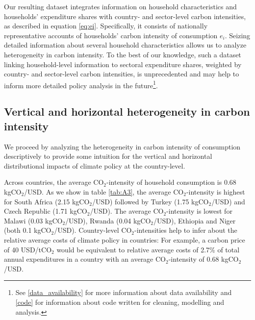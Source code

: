 \documentclass[12pt, a4paper]{article}
\begin{document}
Our resulting dataset integrates information on household characteristics and households' expenditure shares with country- and sector-level carbon intensities, as described in equation \ref{eq:ei}. Specifically, it consists of nationally representative accounts of households' carbon intensity of consumption $e_{i}$. Seizing detailed information about several household characteristics allows us to analyze heterogeneity in carbon intensity. To the best of our knowledge, such a dataset linking household-level information to sectoral expenditure shares, weighted by country- and sector-level carbon intensities, is unprecedented and may help to inform more detailed policy analysis in the future\footnote{See \ref{data_availability} for more information about data availability and \ref{code} for information about code written for cleaning, modelling and analysis.}.

\subsection{Vertical and horizontal heterogeneity in carbon intensity} \label{sec:descriptive}

We proceed by analyzing the heterogeneity in carbon intensity of consumption descriptively to provide some intuition for the vertical and horizontal distributional impacts of climate policy at the country-level.

Across countries, the average CO$_{2}$-intensity of household consumption is 0.68 kgCO$_{2}$/USD. As we show in table \ref{tab:A3}, the average CO$_{2}$-intensity is highest for South Africa (2.15 kgCO$_{2}$/USD) followed by Turkey (1.75 kgCO$_{2}$/USD) and Czech Republic (1.71 kgCO$_{2}$/USD). The average CO$_{2}$-intensity is lowest for Malawi (0.03 kgCO$_{2}$/USD), Rwanda (0.04 kgCO$_{2}$/USD), Ethiopia and Niger (both 0.1 kgCO$_{2}$/USD). Country-level CO$_{2}$-intensities help to infer about the relative average costs of climate policy in countries: For example, a carbon price of 40 USD/tCO$_{2}$ \autocite{Stiglitz.2017} would be equivalent to relative average costs of 2.7\% of total annual expenditures in a country with an average CO$_{2}$-intensity of 0.68 kgCO$_{2}$/USD.

\end{document}
